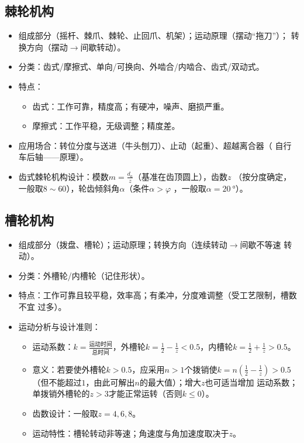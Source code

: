 \documentclass[12pt,a4paper]{article}
\newcommand{\tightlist}{\setlength{\parskip}{0pt}\setlength{\itemsep}{0pt}}
\newcommand{\hint}[1]{\textsf{（#1）}}
\newcommand{\minor}[1]{{\color{gray} #1}}
\newcommand{\then}{$\to$}
\begin{document}
\subsection{棘轮机构}
\begin{itemize}\tightlist
    \item 组成部分\hint{摇杆、棘爪、棘轮、止回爪、机架}；运动原理\hint{摆动“拖刀”}；
    转换方向\hint{摆动\then 间歇转动}。
    \item 分类：齿式/摩擦式、单向/可换向、外啮合/内啮合、齿式/双动式。
    \item 特点：
    \begin{itemize}\tightlist
        \item 齿式：工作可靠，精度高；有硬冲，噪声、磨损严重。
        \item 摩擦式：工作平稳，无级调整；精度差。
    \end{itemize}
    \item 应用场合：转位分度与送进\hint{牛头刨刀}、止动\hint{起重}、超越离合器\hint{
    自行车后轴——原理}。
    \item 齿式棘轮机构设计：模数$m=\frac{d_a}{z}$\hint{基准在齿顶圆上}，齿数$z$
    \hint{按分度确定，一般取$8\sim60$}，轮齿倾斜角$\alpha$\hint{条件$\alpha>\varphi$
    ，一般取$\alpha=\SI{20}{\degree}$}。
\end{itemize}

\subsection{槽轮机构}
\begin{itemize}\tightlist
    \item 组成部分\hint{拨盘、槽轮}；运动原理；转换方向\hint{连续转动\then 间歇不等速
    转动}。
    \item 分类：外槽轮/内槽轮\hint{记住形状}。
    \item 特点：工作可靠且较平稳，效率高；有柔冲，分度难调整\hint{受工艺限制，槽数不宜
    过多}。
    \item 运动分析与设计准则：
    \begin{itemize}\tightlist
        \item 运动系数：$k=\frac{\text{运动时间}}{\text{总时间}}$，外槽轮$k=\frac12
        -\frac1z<0.5$，内槽轮$k=\frac12+\frac1z>0.5$。
        \item 意义：若要使外槽轮$k>0.5$，应采用$n>1$个拨销使$k=n\left(\frac12-\frac%
        1z\right)>0.5$\hint{但不能超过$1$，由此可解出$n$的最大值}；增大$z$也可适当增加
        运动系数；单拨销外槽轮的$z>3$才能正常运转\hint{否则$k\leq0$}。
        \item 齿数设计：一般取$z=4,6,8$。
        \item \minor{运动特性：槽轮转动非等速；角速度与角加速度取决于$z$。}
    \end{itemize}
\end{itemize}
\end{document}

